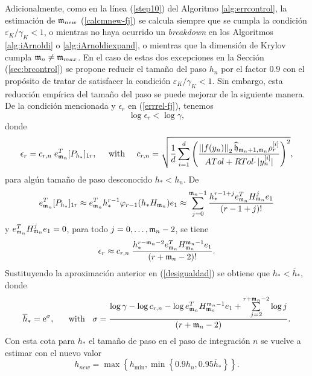  Adicionalmente, como en la línea (\ref{step10}) del Algoritmo \ref{alg:errcontrol}, la estimación de $\mathfrak{m}_{new}$ (\ref{calcmnew-fj}) se calcula siempre que se cumpla la condición $\varepsilon_{K}/\gamma_{K}< 1 $, o mientras no haya ocurrido un \textit{breakdown} en los Algoritmos \ref{alg:iArnoldi} o \ref{alg:iArnoldiexpand}, o mientras que la dimensión de Krylov cumpla $\mathfrak{m}_n\neq\mathfrak{m}_{max}$. En el caso de estas dos excepciones en la Sección (\ref{sec:brcontrol}) se propone reducir el tamaño del paso $h_n$ por el factor $0\mathord{.}9$ con el propósito de tratar de satisfacer la condición $\varepsilon_{K}/\gamma_{K}< 1$. Sin embargo, esta reducción empírica del tamaño del paso se puede mejorar de la siguiente manera. De la condición mencionada y $\epsilon_{r}$ en (\ref{errrel-fj}), tenemos
	\begin{equation}\label{desigualdad}
		\log{\epsilon_{r}}<\log{\gamma},
	\end{equation}
	donde
	\begin{equation*}
		\epsilon _{r} = c_{r,n} \; e_{\mathfrak{m}_n}^{T}[P_{h_*}]_{1r}, \;\;\;\;\; \text{with} \;\;\;\;\; c_{r,n}=\sqrt{\frac{1}{d}\sum\limits_{i=1}^{d}\left( \frac{	\left\lvert \left\lvert f(y_n) \right\rvert \right\rvert_{2}\widehat{\mathfrak{h}}_{\mathfrak{m}_n+1,\mathfrak{m}_n}\rho _{r}^{[i]}}{ATol+RTol \cdotp\rvert y_{n}^{[i]}\rvert }\right) ^{2}},
	\end{equation*}
	para algún tamaño de paso desconocido $h_*<h_n$. De
	\begin{equation*}
		e_{\mathfrak{m}_n}^{T}[P_{h_*}]_{1r} \approx e_{\mathfrak{m}_n}^{T}h_*^{r-1}\varphi
		_{r-1}(h_*H_{\mathfrak{m}_n})e_{1} \approx \sum\limits_{j=0}^{\mathfrak{m}_n-1} \frac{ h_*^{r-1+j} e_{\mathfrak{m}_n}^T H_{\mathfrak{m}_n}^{j} e_1}{(r-1+j)!}
	\end{equation*}
	y $e_{\mathfrak{m}_n}^{T}H_{\mathfrak{m}_n}^{j}e_{1}=0$, para todo $j=0,\ldots,\mathfrak{m}_n-2$, se tiene
	\begin{equation*}
		\epsilon _{r} \approx c_{r,n} \; \frac{h_*^{r-\mathfrak{m}_n-2} e_{\mathfrak{m}_n}^T H_{\mathfrak{m}_n}^{\mathfrak{m}_n-1} e_1}{(r+\mathfrak{m}_n-2)!}.
	\end{equation*}
	Sustituyendo la aproximación anterior en (\ref{desigualdad}) se obtiene que $h_*<\overline{h}_*$, donde
    \[ \overline{h}_* = \mathrm{e}^{\sigma},   \;\;\;\;\;\;  \text{with }  \;\;  \sigma=\dfrac{ \log{\gamma} - \log{c_{r,n}} -\log{e_{\mathfrak{m}_n}^T H_{\mathfrak{m}_n}^{\mathfrak{m}_n-1} e_1}+\sum\limits_{j=2}^{r+\mathfrak{m}_n-2}\log{j}}{(r+\mathfrak{m}_n-2)}. \]
	Con esta cota para $h_*$ el tamaño de paso en el paso de integración $n$ se vuelve a estimar con el nuevo valor
	\begin{equation}
		h_{new} = \max \left\{ h_{\min }, \min \left\{ 0\mathord{.}9h_n,0\mathord{.}95\overline{h}_*\right\} \right\}.\label{hnew}
	\end{equation}


